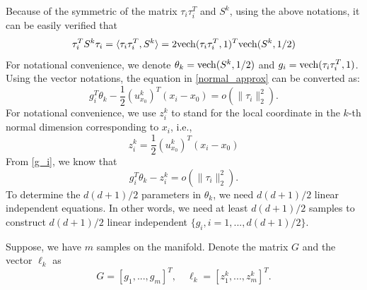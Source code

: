 \documentclass[aos,preprint]{imsart}
\theoremstyle{remark}
\begin{document}

Because of the symmetric of the matrix $\tau_i\tau_i^T$ and $S^k$, using the above notations, it can be easily verified that
\[
\tau_i^TS^k\tau_i = \langle \tau_i\tau_i^T, S^k\rangle =2{\rm vech}(\tau_i\tau_i^T,1)^T {\rm vech}(S^k,1/2)%
\]
For notational convenience, we denote $\theta_k = {\rm vech}(S^k,1/2)$ and $g_i = {\rm vech}(\tau_i\tau_i^T,1)$.
Using the vector notations, the equation in \eqref{normal_approx} can be converted as:
\begin{equation}\label{g_i}
g_i^T \theta_k  - \frac{1}{2}{(u^k_{x_0})}^T (x_i -x_0) = o(\|\tau_i\|_2^2).
\end{equation}
For notational convenience, we use $z_i^k$ to stand for the local coordinate in the $k$-th normal dimension corresponding to $x_i$, i.e.,
\[
z_i^k =  \frac{1}{2}{(u^k_{x_0})}^T (x_i -x_0) %
\] 
From \eqref{g_i}, we know that
\[
g_i^T \theta_k  - z_i^k= o(\|\tau_i\|_2^2).
\]
To determine the ${d(d+1)}/{2}$ parameters in $\theta_k$, we need ${d(d+1)}/{2}$ linear independent equations. In other words, we need at least ${d(d+1)}/{2}$ samples to construct ${d(d+1)}/{2}$ linear independent $\{g_i, i = 1,...,{d(d+1)}/{2}\}$. 

Suppose, we have $m$ samples on the manifold. Denote the matrix $G$ and the vector $\ell_k$ as
\[
G = [g_1,...,g_m]^T, \quad \ell_k = [z_1^k,..., z^k_m ]^T.
\]
\end{document}
